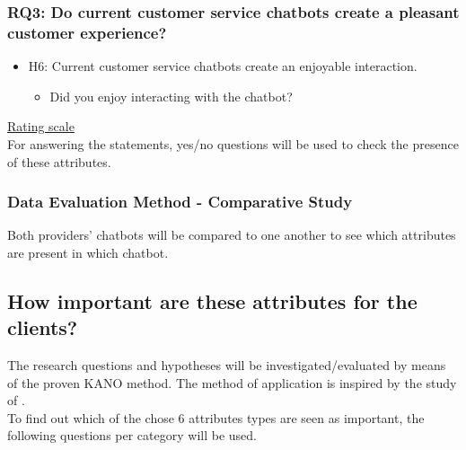 \subsubsection{RQ3: Do current customer service chatbots create a pleasant customer experience?}
\begin{itemize}
	\item H6: Current customer service chatbots create an enjoyable interaction.
	\begin{itemize}
		\item Did you enjoy interacting with the chatbot?
	\end{itemize}
\end{itemize}
\ul{Rating scale}\\
For answering the statements, yes/no questions will be used to check the presence of these attributes.\\

\subsubsection{Data Evaluation Method - Comparative Study}
Both providers’ chatbots will be compared to one another to see which attributes are present in which chatbot.\\

\subsection{How important are these attributes for the clients?}
The research questions and hypotheses will be investigated/evaluated by means of the proven KANO method. The method of application is inspired by the study of \citep{Verkeyn2018}.\\
\break
To find out which of the chose 6 attributes types are seen as important, the following questions per category will be used.

